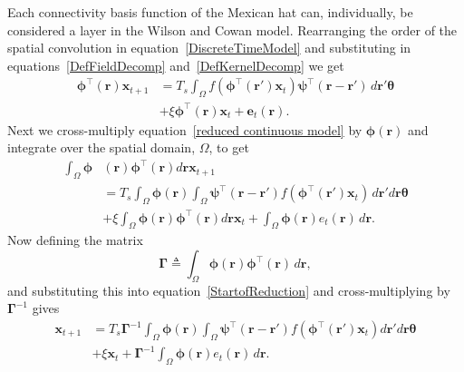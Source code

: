 \documentclass[review,authoryear,3p]{elsarticle}
\begin{document}
Each connectivity basis function of the Mexican hat can, individually, be considered a layer in the Wilson and Cowan model. Rearranging the order of the spatial convolution in equation~\ref{DiscreteTimeModel} and substituting in equations~\ref{DefFieldDecomp} and~\ref{DefKernelDecomp} we get 
\begin{align}
	\label{reduced continuous model}
	\boldsymbol{\phi}^{\top}(\mathbf{r})\mathbf{x}_{t+1} &= T_s\int_\Omega{f(\boldsymbol{\phi}^{\top}(\mathbf{r}')\mathbf{x}_t )\boldsymbol{\psi}^{\top}(\mathbf{r}-\mathbf{r}') \, d\mathbf{r}'}\boldsymbol{\theta} \nonumber \\
	&+ \xi\boldsymbol{\phi}^{\top}(\mathbf{r})\mathbf{x}_t + \mathbf{e}_t(\mathbf{r}). 
\end{align}
Next we cross-multiply equation~\ref{reduced continuous model} by $\boldsymbol{\phi}(\mathbf{r})$ and integrate over the spatial domain, $\Omega$, to get 
\begin{align}
	\label{StartofReduction}
 	\int_\Omega \boldsymbol{\phi} &\left(\mathbf{r}\right)\boldsymbol{\phi}^{\top}\left(\mathbf{r}\right)d\mathbf{r} \mathbf{x}_{t+1}  \nonumber \\
 &=T_s \int_\Omega \boldsymbol{\phi} (\mathbf{r}) \int_\Omega \boldsymbol{\psi}^{\top} (\mathbf{r}-\mathbf{r}') 
 f(\boldsymbol{\phi}^{\top}(\mathbf{r}') \mathbf{x}_t ) \, d\mathbf{r}'d\mathbf{r}\boldsymbol{\theta} \nonumber \\ 
&+ \xi\int_\Omega {\boldsymbol{\phi}(\mathbf{r})\boldsymbol{\phi}^{\top}(\mathbf{r})d\mathbf{r}} \mathbf{x}_t + 
\int_\Omega{\boldsymbol{\phi} (\mathbf{r}) e_t(\mathbf{r}) \, d\mathbf{r}}. 
\end{align}
Now defining the matrix
\begin{equation}\label{eq:DefGamma}
	\boldsymbol{\Gamma} \triangleq \int_\Omega {\boldsymbol{\phi} \left(\mathbf{r}\right)\boldsymbol{\phi} ^{\top}\left(\mathbf{r}\right) \, d\mathbf{r}}, 
\end{equation}
and substituting this into equation~\ref{StartofReduction} and cross-multiplying by $\boldsymbol{\Gamma}^{-1}$ gives
\begin{align}
    \label{eq:ReducedForm}
	 \mathbf{x}_{t+1} &= T_s\boldsymbol{\Gamma}^{-1}
	 \int_\Omega \boldsymbol{\phi}(\mathbf{r}) 
	 \int_\Omega \boldsymbol{\psi}^{\top} (\mathbf{r}-\mathbf{r}')f(\boldsymbol{\phi}^{\top}(\mathbf{r}')\mathbf{x}_t)d\mathbf{r}' d\mathbf{r} \boldsymbol{\theta}  \nonumber \\
	& + \xi\mathbf{x}_t + \boldsymbol{\Gamma}^{-1} \int_\Omega{\boldsymbol{\phi}(\mathbf{r}) e_t(\mathbf{r}) \, d\mathbf{r}}.
\end{align}
\end{document}
